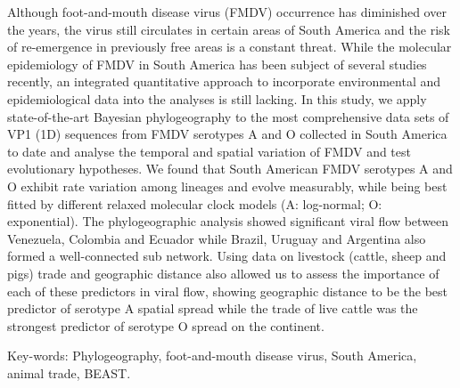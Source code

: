 \documentclass[10pt]{article}
\begin{document}
Although foot-and-mouth disease virus (FMDV) occurrence has diminished over the years, the virus still circulates in certain areas of South America and the risk of re-emergence in previously free areas is a constant threat.
While the molecular epidemiology of FMDV in South America has been subject of several studies recently, an integrated quantitative approach to incorporate environmental and epidemiological data into the analyses is still lacking.
In this study, we apply state-of-the-art Bayesian phylogeography to the most comprehensive data sets of VP1 (1D) sequences from FMDV serotypes A and O collected in South America to date and analyse the temporal and spatial variation of FMDV and test evolutionary hypotheses.
We found that South American FMDV serotypes A and O exhibit rate variation among lineages and evolve measurably, while being best fitted by different relaxed molecular clock models (A: log-normal; O: exponential).
The phylogeographic analysis showed significant viral flow between Venezuela, Colombia and Ecuador while Brazil, Uruguay and Argentina also formed a well-connected sub network.
Using data on livestock (cattle, sheep and pigs) trade and geographic distance also allowed us to assess the importance of each of these predictors in viral flow, showing geographic distance to be the best predictor of serotype A spatial spread while the trade of live cattle was the strongest predictor of serotype O spread on the continent.

Key-words: Phylogeography, foot-and-mouth disease virus, South America, animal trade, BEAST.
\end{document}
